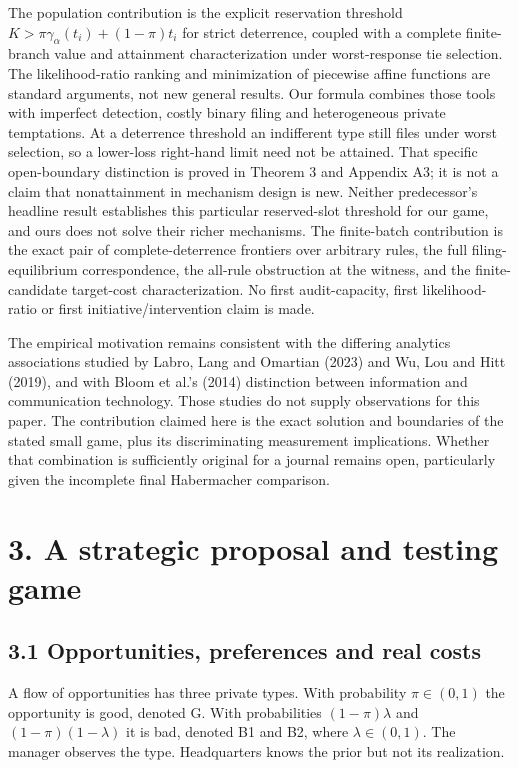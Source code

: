 \documentclass[
  11pt,
]{article}
\begin{document}
The population contribution is the explicit reservation threshold
\(K>\pi\gamma_\alpha(t_i)+(1-\pi)t_i\) for strict deterrence, coupled
with a complete finite-branch value and attainment characterization
under worst-response tie selection. The likelihood-ratio ranking and
minimization of piecewise affine functions are standard arguments, not
new general results. Our formula combines those tools with imperfect
detection, costly binary filing and heterogeneous private temptations.
At a deterrence threshold an indifferent type still files under worst
selection, so a lower-loss right-hand limit need not be attained. That
specific open-boundary distinction is proved in Theorem 3 and Appendix
A3; it is not a claim that nonattainment in mechanism design is new.
Neither predecessor's headline result establishes this particular
reserved-slot threshold for our game, and ours does not solve their
richer mechanisms. The finite-batch contribution is the exact pair of
complete-deterrence frontiers over arbitrary rules, the full
filing-equilibrium correspondence, the all-rule obstruction at the
witness, and the finite-candidate target-cost characterization. No first
audit-capacity, first likelihood-ratio or first initiative/intervention
claim is made.

The empirical motivation remains consistent with the differing analytics
associations studied by Labro, Lang and Omartian (2023) and Wu, Lou and
Hitt (2019), and with Bloom et al.'s (2014) distinction between
information and communication technology. Those studies do not supply
observations for this paper. The contribution claimed here is the exact
solution and boundaries of the stated small game, plus its
discriminating measurement implications. Whether that combination is
sufficiently original for a journal remains open, particularly given the
incomplete final Habermacher comparison.

\section{3. A strategic proposal and testing
game}\label{a-strategic-proposal-and-testing-game}

\subsection{3.1 Opportunities, preferences and real
costs}\label{opportunities-preferences-and-real-costs}

A flow of opportunities has three private types. With probability
\(\pi\in(0,1)\) the opportunity is good, denoted G. With probabilities
\((1-\pi)\lambda\) and \((1-\pi)(1-\lambda)\) it is bad, denoted B1 and
B2, where \(\lambda\in(0,1)\). The manager observes the type.
Headquarters knows the prior but not its realization.
\end{document}
